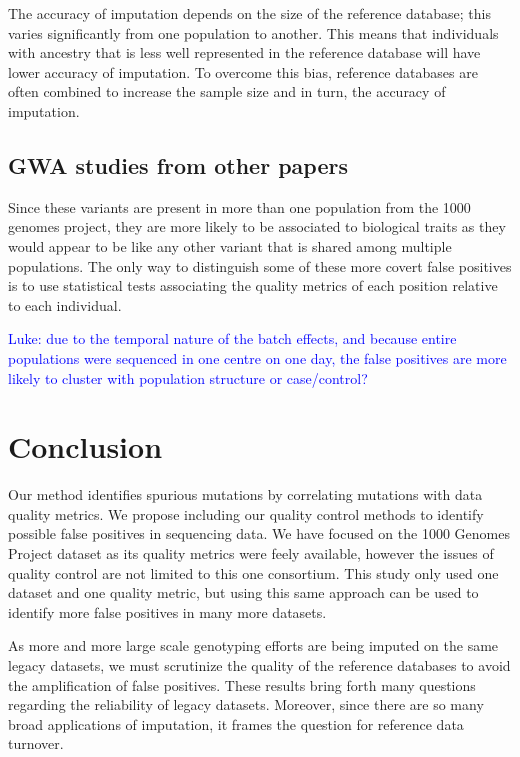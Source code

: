 \documentclass[9pt,lineno]{elife}
\newcommand{\luke}[1]{\textcolor{blue}{Luke: #1}}
\begin{document}
The accuracy of imputation depends on the size of the reference database; this varies significantly from one population to another.
This means that individuals with ancestry that is less well represented in the reference database will have lower accuracy of imputation.
To overcome this bias, reference databases are often combined to increase the sample size and in turn, the accuracy of imputation.

\subsection{GWA studies from other papers}
Since these variants are present in more than one population from the 1000 genomes project, they are more likely to be associated to biological traits as they would appear to be like any other variant that is shared among multiple populations. 
The only way to distinguish some of these more covert false positives is to use statistical tests associating the quality metrics of each position relative to each individual. 

\luke{due to the temporal nature of the batch effects, and because entire populations were sequenced in one centre on one day, the false positives are more likely to cluster with population structure or case/control?}

			\section{Conclusion}
Our method identifies spurious mutations by correlating mutations with data quality metrics. 
We propose including our quality control methods to identify possible false positives in sequencing data. 
We have focused on the 1000 Genomes Project dataset as its quality metrics were feely available, however the issues of quality control are not limited to this one consortium. 
This study only used one dataset and one quality metric, but using this same approach can be used to identify more false positives in many more datasets. 

As more and more large scale genotyping efforts are being imputed on the same legacy datasets, we must scrutinize the quality of the reference databases to avoid the amplification of false positives. 
These results bring forth many questions regarding the reliability of legacy datasets. 
Moreover, since there are so many broad applications of imputation, it frames the question for reference data turnover. 
\end{document}
